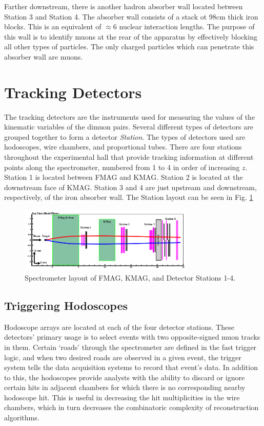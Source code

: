 Farther downstream, there is another hadron absorber wall located between Station 3 and Station 4. The absorber wall consists of a stack ot 98cm thick iron blocks. This is an equivalent of $\approx 6$ nuclear interaction lengths. The purpose of this wall is to identify muons at the rear of the apparatus by effectively blocking all other types of particles. The only charged particles which can penetrate this absorber wall are muons.

\section{Tracking Detectors}

The tracking detectors are the instruments used for measuring the values of the kinematic variables of the dimuon pairs. Several different types of detectors are grouped together to form a detector \emph{Station}. The types of detectors used are hodoscopes, wire chambers, and proportional tubes. There are four stations throughout the experimental hall that provide tracking information at different points along the spectrometer, numbered from 1 to 4 in order of increasing $z$. Station 1 is located between FMAG and KMAG. Station 2 is located at the downstream face of KMAG. Station 3 and 4 are just upstream and downstream, respectively, of the iron absorber wall. The Station layout can be seen in Fig. \ref{fig:stations}

\begin{figure}
	\centering
	\includegraphics[width=0.75\textwidth]{figures/stations.png}
	\caption{Spectrometer layout of FMAG, KMAG, and Detector Stations 1-4.}
	\label{fig:stations}
\end{figure}

\subsection{Triggering Hodoscopes}

Hodoscope arrays are located at each of the four detector stations. These detectors' primary usage is to select events with two opposite-signed muon tracks in them. Certain `roads' through the spectrometer are defined in the fast trigger logic, and when two desired roads are observed in a given event, the trigger system tells the data acquisition systems to record that event's data. In addition to this, the hodoscopes provide analysts with the ability to discard or ignore certain hits in adjacent chambers for which there is no corresponding nearby hodoscope hit. This is useful in decreasing the hit multiplicities in the wire chambers, which in turn decreases the combinatoric complexity of reconstruction algorithms.

